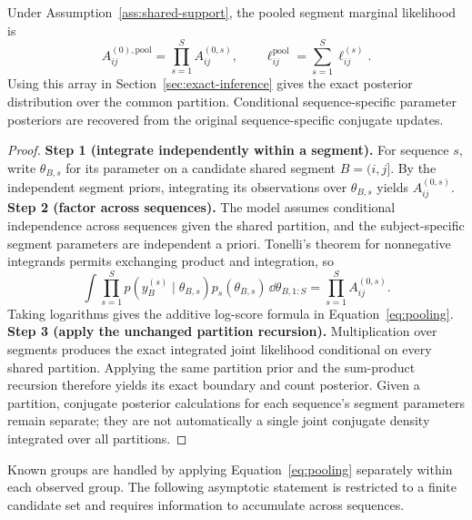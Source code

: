 \begin{theorem}
\label{thm:pooling-paper}
Under Assumption~\ref{ass:shared-support}, the pooled segment marginal likelihood is
\begin{equation}
 A^{(0),\mathrm{pool}}_{ij}=\prod_{s=1}^{S}A^{(0,s)}_{ij},
 \qquad
 \ell^{\mathrm{pool}}_{ij}=\sum_{s=1}^{S}\ell^{(s)}_{ij}.
\label{eq:pooling}
\end{equation}
Using this array in Section~\ref{sec:exact-inference} gives the exact posterior distribution over the common partition. Conditional sequence-specific parameter posteriors are recovered from the original sequence-specific conjugate updates.
\end{theorem}
\begin{proof}
\textbf{Step 1 (integrate independently within a segment).}
For sequence $s$, write $\theta_{B,s}$ for its parameter on a candidate shared segment $B=(i,j]$. By the independent segment priors, integrating its observations over $\theta_{B,s}$ yields $A^{(0,s)}_{ij}$.
\textbf{Step 2 (factor across sequences).}
The model assumes conditional independence across sequences given the shared partition, and the subject-specific segment parameters are independent a priori. Tonelli's theorem for nonnegative integrands permits exchanging product and integration, so
\[
\int\prod_{s=1}^{S}p(y_B^{(s)}\mid\theta_{B,s})p_s(\theta_{B,s})\,\dd\theta_{B,1:S}
=\prod_{s=1}^{S}A^{(0,s)}_{ij}.
\]
Taking logarithms gives the additive log-score formula in Equation~\eqref{eq:pooling}.
\textbf{Step 3 (apply the unchanged partition recursion).}
Multiplication over segments produces the exact integrated joint likelihood conditional on every shared partition. Applying the same partition prior and the sum-product recursion therefore yields its exact boundary and count posterior. Given a partition, conjugate posterior calculations for each sequence's segment parameters remain separate; they are not automatically a single joint conjugate density integrated over all partitions.
\end{proof}

Known groups are handled by applying Equation~\eqref{eq:pooling} separately within each observed group. The following asymptotic statement is restricted to a finite candidate set and requires information to accumulate across sequences.

